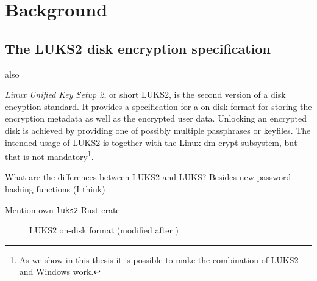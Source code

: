 \section{Background}

\subsection{The LUKS2 disk encryption specification}
also \cite{Fruwirth2018}

\emph{Linux Unified Key Setup 2}, or short LUKS2, is the second version of a disk encyption standard.
It provides a specification \cite{Broz2018} for a on-disk format for storing the encryption metadata as well as the encrypted
user data. Unlocking an encrypted disk is achieved by providing one of possibly multiple passphrases or keyfiles.
The intended usage of LUKS2 is together with the Linux dm-crypt subsystem, but that is not
mandatory\footnote{\label{fn:luks2windows} As we show in this thesis it is possible to make the combination of LUKS2 and
Windows work.}.

What are the differences between LUKS2 and LUKS? Besides new password hashing functions (I think)

Mention own \texttt{luks2} Rust crate

\begin{figure}
	\caption{LUKS2 on-disk format (modified after \cite{Broz2018})}
	\label{fig:luks2ondisk}
\end{figure}

